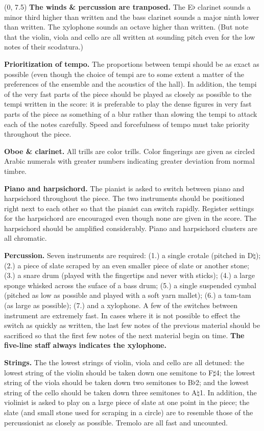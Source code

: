 \documentclass[10pt]{article}
\begin{document}
\begin{textblock}{23}(0, 7.5)
\textbf{The winds \& percussion are tranposed.} The E$\flat$ clarinet sounds a
minor third higher than written and the bass clarinet sounds a major ninth
lower than written. The xylophone sounds an octave higher than written. (But
note that the violin, viola and cello are all written at sounding pitch even
for the low notes of their scodatura.)

\textbf{Prioritization of tempo.} The proportions between tempi should be as
exact as possible (even though the choice of tempi are to some extent a matter
of the preferences of the ensemble and the acoustics of the hall). In addition,
the tempi of the very fast parts of the piece should be played as closely as
possible to the tempi written in the score: it is preferable to play the dense
figures in very fast parts of the piece as something of a blur rather than
slowing the tempi to attack each of the notes carefully. Speed and forcefulness
of tempo must take priority throughout the piece.

\textbf{Oboe \& clarinet.} All trills are color trills. Color fingerings are
given as circled Arabic numerals with greater numbers indicating greater
deviation from normal timbre.

\textbf{Piano and harpsichord.} The pianist is asked to switch between piano
and harpsichord throughout the piece. The two instruments should be positioned
right next to each other so that the pianist can switch rapidly. Register
settings for the harpsichord are encouraged even though none are given in the
score. The harpsichord should be amplified considerably. Piano and harpsichord
clusters are all chromatic.

\textbf{Percussion.} Seven instruments are required: (1.) a single crotale
(pitched in D$\natural$); (2.) a piece of slate scraped by an even smaller
piece of slate or another stone; (3.) a snare drum (played with the fingertips
and never with sticks); (4.) a large sponge whisked across the suface of a bass
drum; (5.) a single suspended cymbal (pitched as low as possible and played
with a soft yarn mallet); (6.) a tam-tam (as large as possible); (7.) and a
xylophone. A few of the switches between instrument are extremely fast. In
cases where it is not possible to effect the switch as quickly as written, the
last few notes of the previous material should be sacrificed so that the first
few notes of the next material begin on time. \textbf{The five-line staff always
indicates the xylophone.}

\textbf{Strings.} The the lowest strings of violin, viola and cello are all
detuned: the lowest string of the violin should be taken down one semitone to
F$\sharp$4; the lowest string of the viola should be taken down two semitones
to B$\flat$2; and the lowest string of the cello should be taken down three
semitones to A$\natural$1. In addition, the violinist is asked to play on a
large piece of slate at one point in the piece; the slate (and small stone used
for scraping in a circle) are to resemble those of the percussionist as closely
as possible. Tremolo are all fast and uncounted.

\end{textblock}
\end{document}
